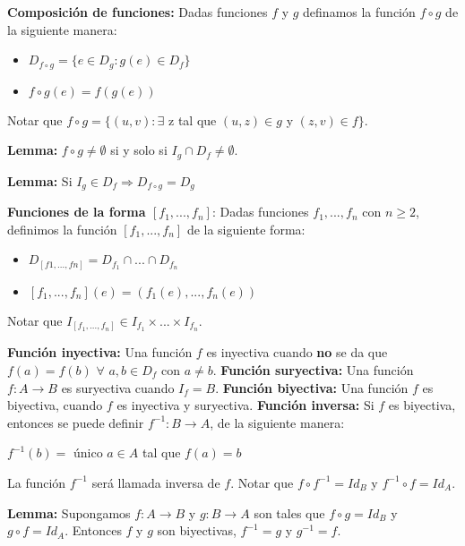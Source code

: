 \documentclass{article}
\begin{document}
\begin{flushleft}
\textbf{Composición de funciones:} Dadas funciones $f$ y $g$ definamos la función $f \circ g$ de la siguiente manera:
\begin{itemize}
\item $D_{f \circ g} = \{ e \in D_g : g(e) \in D_f\}$
\item $f \circ g(e) = f(g(e))$
\end{itemize}

Notar que $f \circ g = \{(u, v): \exists$ z tal que $ (u, z) \in g$ y $(z, v) \in f\}.$\linebreak

\textbf{Lemma:} $f \circ g \neq \emptyset$ si y solo si $I_g \cap D_f \neq \emptyset.$\linebreak

\textbf{Lemma:} Si $I_g \in D_f \Rightarrow D_{f \circ g} = D_g$ \linebreak

\textbf{Funciones de la forma $[f_1,...,f_n]$}: Dadas funciones $f_1, ..., f_n$ con $ n \geq 2$, definimos la función $[f_1, ..., f_n]$ de la siguiente forma:
\begin{itemize}
\item $D_{[f1, ..., fn]} = D_{f_1} \cap ... \cap D_{f_n}$
\item $[f_1, ..., f_n](e) = (f_1(e), ..., f_n(e))$
\end{itemize}
Notar que $I_{[f_1, ..., f_n]} \in I_{f_1} \times ... \times I_{f_n}.$\linebreak

\textbf{Función inyectiva:} Una función $f$ es inyectiva cuando \textbf{no} se da que $f(a) = f(b)$ $\forall$ $a, b \in D_f$ con $a \neq b$.\linebreak
\textbf{Función suryectiva:} Una función $f: A \rightarrow B$ es suryectiva cuando $I_f = B$.\linebreak
\textbf{Función biyectiva:} Una función $f$ es biyectiva, cuando $f$ es inyectiva y suryectiva.\linebreak
\textbf{Función inversa:} Si $f$ es biyectiva, entonces se puede definir $f^{-1}: B \rightarrow A$, de la siguiente manera:
\begin{center}
    $f^{-1}(b) = $ único $a \in A$ tal que $f(a) = b$
\end{center}
La función $f^{-1}$ será llamada inversa de $f$. Notar que $f \circ f^{-1} = Id_B$ y $f^{-1} \circ f = Id_A$.\linebreak

\textbf{Lemma:} Supongamos $f: A \rightarrow B$ y $g: B \rightarrow A$ son tales que $f \circ g = Id_B$ y $g \circ f = Id_A$. Entonces $f$ y $g$ son biyectivas, $f^{-1} = g$ y $g^{-1} = f$.\linebreak


\end{flushleft}
\end{document}
